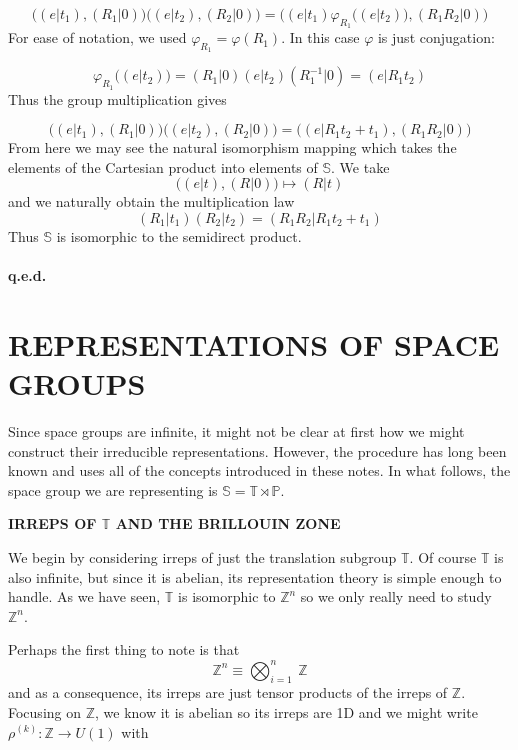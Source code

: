 \documentclass[9 pt]{report}
\begin{document}
$$ \bigg( (e|t_1), (R_1|0) \bigg) \bigg( (e|t_2) , (R_2| 0)  \bigg) = \bigg( (e|t_1)\varphi_{R_1}\big( (e|t_2)\big) , (R_1R_2|0) \bigg)$$
For ease of notation, we used $\varphi_{R_1}=\varphi(R_1)$. In this case $\varphi$ is just conjugation:

$$\varphi_{R_1}\big((e|t_2)\big) = (R_1|0)(e|t_2)(R_1^{-1}|0) = (e|R_1t_2)$$
Thus the group multiplication gives

$$\bigg( (e|t_1), (R_1|0) \bigg) \bigg( (e|t_2) , (R_2| 0)  \bigg) = \bigg( (e|R_1t_2+t_1) , (R_1R_2|0) \bigg)$$ 
From here we may see the natural isomorphism mapping which takes the elements of the Cartesian product into elements of $\mathbb{S}$. We take 
$$ \bigg((e|t), (R|0)\bigg) \mapsto (R|t) $$
and we naturally obtain the multiplication law
$$ (R_1|t_1)(R_2|t_2) = (R_1R_2 | R_1t_2 + t_1)  $$
Thus $\mathbb{S}$ is isomorphic to the semidirect product.
\\
\\
\textbf{q.e.d.}



\newpage



{\centering
\section*{REPRESENTATIONS OF SPACE GROUPS}}
Since space groups are infinite, it might not be clear at first how we might construct their irreducible representations. However, the procedure has long been known and uses all of the concepts introduced in these notes. In what follows, the space group we are representing is $\mathbb{S}=\mathbb{T}\rtimes\mathbb{P}$.
\\
\begin{center}
	\textbf{IRREPS OF $\mathbb{T}$ AND THE BRILLOUIN ZONE}
\end{center}
We begin by considering irreps of just the translation subgroup $\mathbb{T}$. Of course $\mathbb{T}$ is also infinite, but since it is abelian, its representation theory is simple enough to handle. As we have seen, $\mathbb{T}$ is isomorphic to $\mathbb{Z}^n$ so we only really need to study $\mathbb{Z}^n$.

Perhaps the first thing to note is that 
$$ \mathbb{Z}^n \equiv \bigotimes_{i=1}^n \:\mathbb{Z}$$
and as a consequence, its irreps are just tensor products of the irreps of $\mathbb{Z}$. Focusing on $\mathbb{Z}$, we know it is abelian so its irreps are 1D and we might write $\rho^{(k)}:\mathbb{Z}\to U(1)$ with
\end{document}
